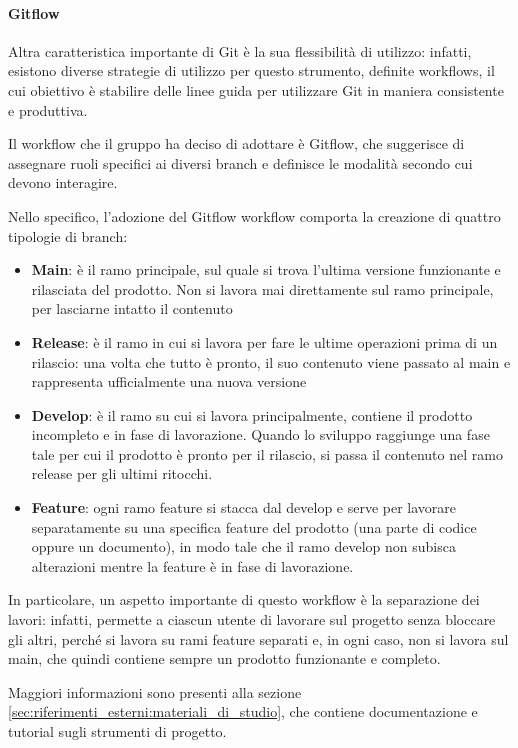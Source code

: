\paragraph{Gitflow}
Altra caratteristica importante di Git è la sua flessibilità di utilizzo: infatti, esistono diverse strategie di utilizzo per questo strumento, definite workflows, il cui obiettivo è stabilire delle linee guida per utilizzare Git in maniera consistente e produttiva.
\par Il workflow che il gruppo ha deciso di adottare è Gitflow, che suggerisce di assegnare ruoli specifici ai diversi branch e definisce le modalità secondo cui devono interagire.
\par Nello specifico, l'adozione del Gitflow workflow comporta la creazione di quattro tipologie di branch:
\begin{itemize}
    \item \textbf{Main}: è il ramo principale, sul quale si trova l'ultima versione funzionante e rilasciata del prodotto. Non si lavora mai direttamente sul ramo principale, per lasciarne intatto il contenuto
    \item \textbf{Release}: è il ramo in cui si lavora per fare le ultime operazioni prima di un rilascio: una volta che tutto è pronto, il suo contenuto viene passato al main e rappresenta ufficialmente una nuova versione
    \item \textbf{Develop}: è il ramo su cui si lavora principalmente, contiene il prodotto incompleto e in fase di lavorazione. Quando lo sviluppo raggiunge una fase tale per cui il prodotto è pronto per il rilascio, si passa il contenuto nel ramo release per gli ultimi ritocchi.
    \item \textbf{Feature}: ogni ramo feature si stacca dal develop e serve per lavorare separatamente su una specifica feature del prodotto (una parte di codice oppure un documento), in modo tale che il ramo develop non subisca alterazioni mentre la feature è in fase di lavorazione.
\end{itemize}
In particolare, un aspetto importante di questo workflow è la separazione dei lavori: infatti, permette a ciascun utente di lavorare sul progetto senza bloccare gli altri, perché si lavora su rami feature separati e, in ogni caso, non si lavora sul main, che quindi contiene sempre un prodotto funzionante e completo.
\par Maggiori informazioni sono presenti alla sezione \ref{sec:riferimenti_esterni:materiali_di_studio}, che contiene documentazione e tutorial sugli strumenti di progetto.


